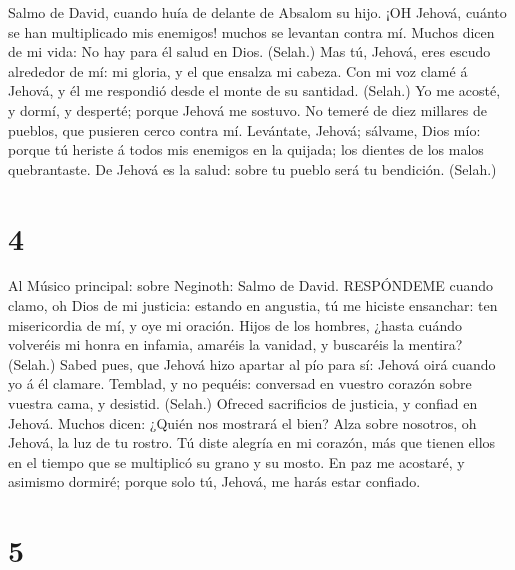  Salmo de David, cuando huía de delante de Absalom su hijo.
¡OH Jehová, cuánto se han multiplicado mis enemigos! muchos se levantan
contra mí.  Muchos dicen de mi vida: No hay para él salud en
Dios. (Selah.)  Mas tú, Jehová, eres escudo alrededor de mí:
mi gloria, y el que ensalza mi cabeza.  Con mi voz clamé á
Jehová, y él me respondió desde el monte de su santidad. (Selah.)
 Yo me acosté, y dormí, y desperté; porque Jehová me
sostuvo.  No temeré de diez millares de pueblos, que
pusieren cerco contra mí.  Levántate, Jehová; sálvame, Dios
mío: porque tú heriste á todos mis enemigos en la quijada; los dientes
de los malos quebrantaste.  De Jehová es la salud: sobre tu
pueblo será tu bendición. (Selah.)

\hypertarget{section-3}{%
\section{4}\label{section-3}}

 Al Músico principal: sobre Neginoth: Salmo de David.
RESPÓNDEME cuando clamo, oh Dios de mi justicia: estando en angustia, tú
me hiciste ensanchar: ten misericordia de mí, y oye mi oración.
 Hijos de los hombres, ¿hasta cuándo volveréis mi honra en
infamia, amaréis la vanidad, y buscaréis la mentira? (Selah.)
 Sabed pues, que Jehová hizo apartar al pío para sí: Jehová
oirá cuando yo á él clamare.  Temblad, y no pequéis:
conversad en vuestro corazón sobre vuestra cama, y desistid. (Selah.)
 Ofreced sacrificios de justicia, y confiad en Jehová.
 Muchos dicen: ¿Quién nos mostrará el bien? Alza sobre
nosotros, oh Jehová, la luz de tu rostro.  Tú diste alegría
en mi corazón, más que tienen ellos en el tiempo que se multiplicó su
grano y su mosto.  En paz me acostaré, y asimismo dormiré;
porque solo tú, Jehová, me harás estar confiado.

\hypertarget{section-4}{%
\section{5}\label{section-4}}

